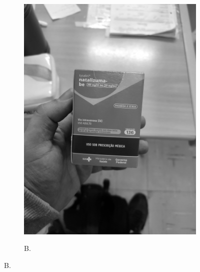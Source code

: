 \begin{figure}[htb]
\begin{subfigure}[t]{0.21\textwidth}
        \includegraphics[width=\linewidth]{../pictures/tysabri_rgb_g_only.jpg}
    \end{subfigure}
    \hfill
    \begin{subfigure}[t]{0.21\textwidth}
        \centering
        \caption{B.}
        \label{fig:foto:versoes:1:B}

\end{subfigure}
\end{figure}
